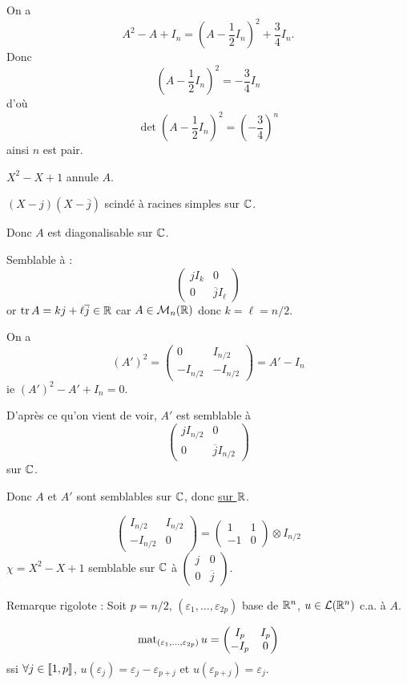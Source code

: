 \begin{solution}
On a
\[
A^2-A+I_n=\left(A-\frac12I_n\right)^2+\frac34I_n.
\]
Donc
\[
\left(A-\frac12I_n\right)^2=-\frac34I_n
\]
d'où
\[
\det\left(A-\frac12I_n\right)^2=\left(-\frac34\right)^n
\]
ainsi $n$ est pair.

$X^2-X+1$ annule $A$.

$(X-j)(X-\overline j)$ scindé à racines simples sur $\mathbb C$.

Donc $A$ est diagonalisable sur $\mathbb C$.

Semblable à :
\[
\begin{pmatrix}jI_k&0\\0&\overline j I_\ell\end{pmatrix}
\]
or $\operatorname{tr} A=kj+\ell\overline j\in\mathbb R$ car $A\in\mathcal M_n(\mathbb R)$ donc $k=\ell=n/2$.

On a
\[
(A')^2=
\begin{pmatrix}0&I_{n/2}\\-I_{n/2}&-I_{n/2}\end{pmatrix}
=A'-I_n
\]
ie $(A')^2-A'+I_n=0$.

D'après ce qu'on vient de voir, $A'$ est semblable à
\[
\begin{pmatrix}jI_{n/2}&0\\0&\overline j I_{n/2}\end{pmatrix}
\]
sur $\mathbb C$.

Donc $A$ et $A'$ sont semblables sur $\mathbb C$, donc \underline{sur $\mathbb R$}.

\begin{remarkbox}
\[
\begin{pmatrix}I_{n/2}&I_{n/2}\\-I_{n/2}&0\end{pmatrix}
=\begin{pmatrix}1&1\\-1&0\end{pmatrix}\otimes I_{n/2}
\]
$\chi=X^2-X+1$ semblable sur $\mathbb C$ à $\begin{pmatrix}j&0\\0&\overline j\end{pmatrix}$.
\end{remarkbox}

\begin{remarkbox}
Remarque rigolote : Soit $p=n/2$, $(\varepsilon_1,\dots,\varepsilon_{2p})$
base de $\mathbb R^n$, $u\in\mathcal L(\mathbb R^n)$ c.a. à $A$.

\[
\operatorname{mat}_{(\varepsilon_1,\dots,\varepsilon_{2p})}u
=\begin{pmatrix}I_p&I_p\\-I_p&0\end{pmatrix}
\]
ssi $\forall j\in\llbracket 1,p\rrbracket$, $u(\varepsilon_j)=\varepsilon_j-\varepsilon_{p+j}$
et $u(\varepsilon_{p+j})=\varepsilon_j$.


\end{remarkbox}
\end{solution}

